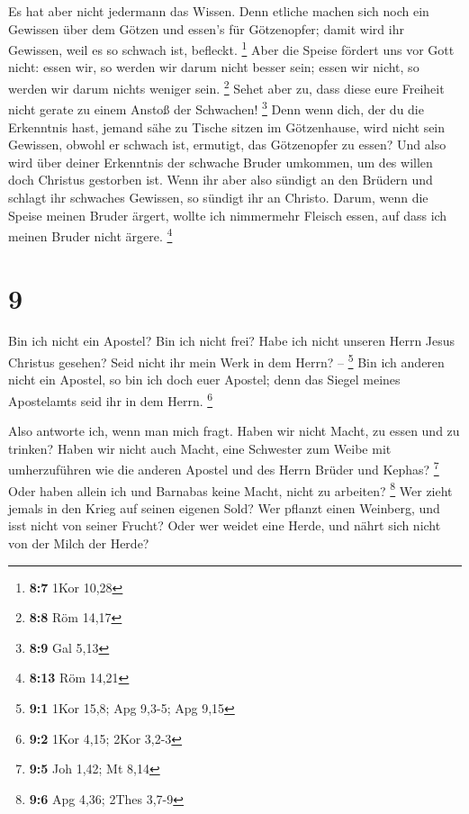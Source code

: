  Es hat aber nicht jedermann das Wissen. Denn etliche machen
sich noch ein Gewissen über dem Götzen und essen's für Götzenopfer;
damit wird ihr Gewissen, weil es so schwach ist, befleckt. \footnote{\textbf{8:7}
  1Kor 10,28}  Aber die Speise fördert uns vor Gott nicht:
essen wir, so werden wir darum nicht besser sein; essen wir nicht, so
werden wir darum nichts weniger sein. \footnote{\textbf{8:8} Röm 14,17}
 Sehet aber zu, dass diese eure Freiheit nicht gerate zu
einem Anstoß der Schwachen! \footnote{\textbf{8:9} Gal 5,13}
 Denn wenn dich, der du die Erkenntnis hast, jemand sähe zu
Tische sitzen im Götzenhause, wird nicht sein Gewissen, obwohl er
schwach ist, ermutigt, das Götzenopfer zu essen?  Und also
wird über deiner Erkenntnis der schwache Bruder umkommen, um des willen
doch Christus gestorben ist.  Wenn ihr aber also sündigt an
den Brüdern und schlagt ihr schwaches Gewissen, so sündigt ihr an
Christo.  Darum, wenn die Speise meinen Bruder ärgert,
wollte ich nimmermehr Fleisch essen, auf dass ich meinen Bruder nicht
ärgere. \footnote{\textbf{8:13} Röm 14,21}

\hypertarget{section-4}{%
\section{9}\label{section-4}}

 Bin ich nicht ein Apostel? Bin ich nicht frei? Habe ich
nicht unseren Herrn Jesus Christus gesehen? Seid nicht ihr mein Werk in
dem Herrn? -- \footnote{\textbf{9:1} 1Kor 15,8; Apg 9,3-5; Apg 9,15}
 Bin ich anderen nicht ein Apostel, so bin ich doch euer
Apostel; denn das Siegel meines Apostelamts seid ihr in dem Herrn.
\footnote{\textbf{9:2} 1Kor 4,15; 2Kor 3,2-3}

 Also antworte ich, wenn man mich fragt.  Haben
wir nicht Macht, zu essen und zu trinken?  Haben wir nicht
auch Macht, eine Schwester zum Weibe mit umherzuführen wie die anderen
Apostel und des Herrn Brüder und Kephas? \footnote{\textbf{9:5} Joh
  1,42; Mt 8,14}  Oder haben allein ich und Barnabas keine
Macht, nicht zu arbeiten? \footnote{\textbf{9:6} Apg 4,36; 2Thes 3,7-9}
 Wer zieht jemals in den Krieg auf seinen eigenen Sold? Wer
pflanzt einen Weinberg, und isst nicht von seiner Frucht? Oder wer
weidet eine Herde, und nährt sich nicht von der Milch der Herde?

